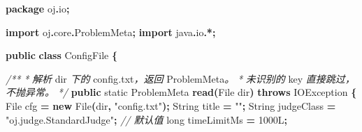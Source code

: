 \documentclass[
  11pt,
]{ctexart}
\newenvironment{Shaded}{\begin{snugshade}}{\end{snugshade}}
\newcommand{\BuiltInTok}[1]{#1}
\newcommand{\CommentTok}[1]{\textcolor[rgb]{0.56,0.35,0.01}{\textit{#1}}}
\newcommand{\DataTypeTok}[1]{\textcolor[rgb]{0.13,0.29,0.53}{#1}}
\newcommand{\DecValTok}[1]{\textcolor[rgb]{0.00,0.00,0.81}{#1}}
\newcommand{\FunctionTok}[1]{\textcolor[rgb]{0.13,0.29,0.53}{\textbf{#1}}}
\newcommand{\ImportTok}[1]{#1}
\newcommand{\KeywordTok}[1]{\textcolor[rgb]{0.13,0.29,0.53}{\textbf{#1}}}
\newcommand{\NormalTok}[1]{#1}
\newcommand{\OperatorTok}[1]{\textcolor[rgb]{0.81,0.36,0.00}{\textbf{#1}}}
\newcommand{\StringTok}[1]{\textcolor[rgb]{0.31,0.60,0.02}{#1}}
\begin{document}
\begin{Shaded}
\begin{Highlighting}[]
\KeywordTok{package}\ImportTok{ oj}\OperatorTok{.}\ImportTok{io}\OperatorTok{;}

\KeywordTok{import} \ImportTok{oj}\OperatorTok{.}\ImportTok{core}\OperatorTok{.}\ImportTok{ProblemMeta}\OperatorTok{;}
\KeywordTok{import} \ImportTok{java}\OperatorTok{.}\ImportTok{io}\OperatorTok{.*;}

\KeywordTok{public} \KeywordTok{class}\NormalTok{ ConfigFile }\OperatorTok{\{}

    \CommentTok{/**}
     \CommentTok{*} \CommentTok{解析}\NormalTok{ dir }\CommentTok{下的}\NormalTok{ config}\CommentTok{.}\NormalTok{txt}\CommentTok{，返回}\NormalTok{ ProblemMeta}\CommentTok{。}
     \CommentTok{*} \CommentTok{未识别的}\NormalTok{ key }\CommentTok{直接跳过，不抛异常。}
     \CommentTok{*/}
    \KeywordTok{public} \DataTypeTok{static}\NormalTok{ ProblemMeta }\FunctionTok{read}\OperatorTok{(}\BuiltInTok{File}\NormalTok{ dir}\OperatorTok{)} \KeywordTok{throws} \BuiltInTok{IOException} \OperatorTok{\{}
        \BuiltInTok{File}\NormalTok{ cfg }\OperatorTok{=} \KeywordTok{new} \BuiltInTok{File}\OperatorTok{(}\NormalTok{dir}\OperatorTok{,} \StringTok{"config.txt"}\OperatorTok{);}
        \BuiltInTok{String}\NormalTok{ title }\OperatorTok{=} \StringTok{""}\OperatorTok{;}
        \BuiltInTok{String}\NormalTok{ judgeClass }\OperatorTok{=} \StringTok{"oj.judge.StandardJudge"}\OperatorTok{;}   \CommentTok{// 默认值}
        \DataTypeTok{long}\NormalTok{ timeLimitMs }\OperatorTok{=} \DecValTok{1000L}\OperatorTok{;}


\end{Highlighting}
\end{Shaded}
\end{document}
